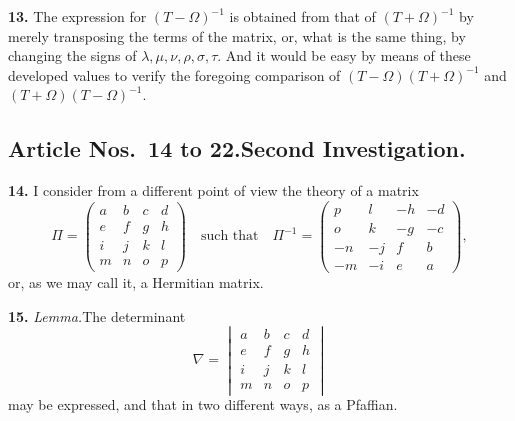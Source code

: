 \documentclass[11pt]{article}
\begin{document}
\textbf{13.} The expression for $(T - \Omega)^{-1}$ is obtained from that of $(T + \Omega)^{-1}$ by merely transposing the terms of the matrix, or, what is the same thing, by changing the signs of $\lambda, \mu, \nu, \rho, \sigma, \tau$. And it would be easy by means of these developed values to verify the foregoing comparison of $(T - \Omega)(T + \Omega)^{-1}$ and $(T + \Omega)(T - \Omega)^{-1}$.

\subsection*{Article Nos.\ 14 to 22.\quad Second Investigation.}

\textbf{14.} I consider from a different point of view the theory of a matrix
\[
\Pi = \begin{pmatrix} a & b & c & d \\ e & f & g & h \\ i & j & k & l \\ m & n & o & p \end{pmatrix}\quad
\text{such that}\quad
\Pi^{-1} = \begin{pmatrix} p & l & -h & -d \\ o & k & -g & -c \\ -n & -j & f & b \\ -m & -i & e & a \end{pmatrix},
\]
or, as we may call it, a Hermitian matrix.

\textbf{15.} \textit{Lemma.}\quad The determinant
\[
\nabla = \begin{vmatrix} a & b & c & d \\ e & f & g & h \\ i & j & k & l \\ m & n & o & p \end{vmatrix}
\]
may be expressed, and that in two different ways, as a Pfaffian.
\end{document}
